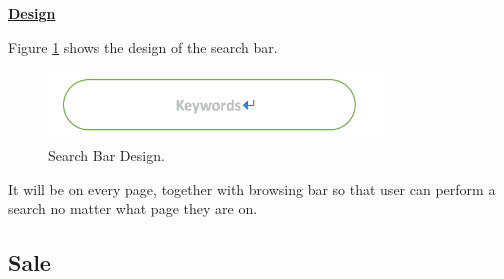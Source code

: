 \documentclass[12pt]{article}
\begin{document}
\par \textbf{\underline{Design}}
\par Figure \ref{search_bar} shows the design of the search bar.
\begin{figure}[!h]
\caption{Search Bar Design.} \label{search_bar}
\begin{center}
\includegraphics[width=9cm]{search_bar}
\end{center}
\end{figure}
\par It will be on every page, together with browsing bar so that user can perform a search no matter what page they are on.

\subsection{Sale}
\end{document}

